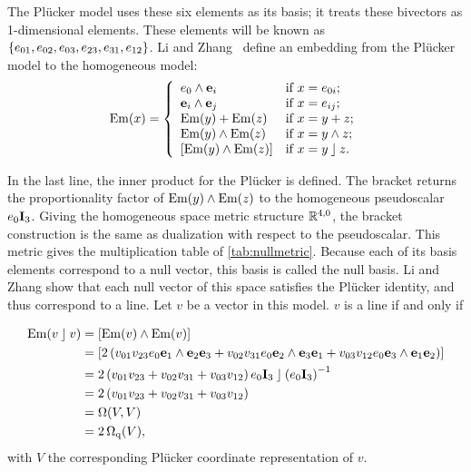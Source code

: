 The Pl\"ucker model uses these six elements as its basis; it treats these bivectors as 1-dimensional elements.  These elements will be known as $\{e_{01}, e_{02}, e_{03}, e_{23}, e_{31}, e_{12}\}$.  Li and Zhang~\cite{Hongbo} define an embedding from the Pl\"ucker model to the homogeneous model:
\begin{equation} \label{eq:Em}
  \operatorname{Em}(x) = \left\{ 
    \begin{array}{ll}
      e_0 \wedge \mathbf{e}_i &\mbox{if $x = e_{0i}$}; \\
      \mathbf{e}_i \wedge \mathbf{e}_j &\mbox{if $x = e_{ij}$}; \\
      \operatorname{Em}(y) + \operatorname{Em}(z) &\mbox{if $x = y + z$}; \\
      \operatorname{Em}(y) \wedge \operatorname{Em}(z) &\mbox{if $x = y \wedge z$}; \\
      \left[\operatorname{Em}(y) \wedge \operatorname{Em}(z)\right] &\mbox{if $x = y \mathbin{\rfloor} z$}. \\
    \end{array}
    \right.
\end{equation}

In the last line, the inner product for the Pl\"ucker is defined.  The bracket returns the proportionality factor of $\operatorname{Em}(y) \wedge \operatorname{Em}(z)$ to the homogeneous pseudoscalar $e_0\mathbf{I}_3$.  Giving the homogeneous space metric structure $\mathbb{R}^{4,0}$, the bracket construction is the same as dualization with respect to the pseudoscalar.  This metric gives the multiplication table of \autoref{tab:nullmetric}.  Because each of its basis elements correspond to a null vector, this basis is called the null basis.  Li and Zhang show that each null vector of this space satisfies the Pl\"ucker identity, and thus correspond to a line.  Let $v$ be a vector in this model.  $v$ is a line if and only if

\begin{align*}
  \operatorname{Em}(v \mathbin{\rfloor} v) &= \left[\operatorname{Em}(v) \wedge \operatorname{Em}(v)\right] \\
    &= \left[ 2 \left( v_{01} v_{23} e_0\mathbf{e}_1 \wedge \mathbf{e}_2\mathbf{e}_3 + v_{02} v_{31} e_0\mathbf{e}_2 \wedge \mathbf{e}_3\mathbf{e}_1 + v_{03} v_{12} e_0\mathbf{e}_3 \wedge \mathbf{e}_1\mathbf{e}_2 \right) \right] \\
    &= 2 \left( v_{01} v_{23} + v_{02} v_{31} + v_{03} v_{12} \right) e_0\mathbf{I}_3 \mathbin{\rfloor} \left(e_0\mathbf{I}_3\right)^{-1} \\
    &= 2 \left( v_{01} v_{23} + v_{02} v_{31} + v_{03} v_{12} \right) \\
    &= \operatorname{\Omega}(V, V) \\
    &= 2 \operatorname{\Omega_q}(V),
\end{align*}
with $V$ the corresponding Pl\"ucker coordinate representation of $v$.

